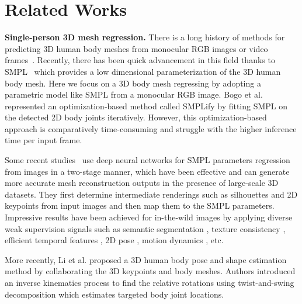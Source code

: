 \documentclass[runningheads]{llncs}
\begin{document}
\section{Related Works}

\noindent \textbf{Single-person 3D mesh regression.} There is a long history of methods for predicting 3D human body meshes from monocular RGB images or video frames~\cite{guan2009estimating}. Recently, there has been quick advancement in this field thanks to SMPL~\cite{smpl} which provides a low dimensional parameterization of the 3D human body mesh. Here we focus on a 3D body mesh regressing by adopting a parametric model like SMPL from a monocular RGB image. Bogo et al.~\cite{bogo2016keep} represented an optimization-based method called SMPLify by fitting SMPL on the detected 2D body joints iteratively. However, this optimization-based approach is comparatively time-consuming and struggle with the higher inference time per input frame.

Some recent studies~\cite{kolotouros2019convolutional,omran2018neural,pavlakos2018learning} use deep neural networks for SMPL parameters regression from images in a two-stage manner, which have been effective and can generate more accurate mesh reconstruction outputs in the presence of large-scale 3D datasets. They first determine intermediate renderings such as silhouettes and 2D keypoints from input images and then map them to the SMPL parameters. Impressive results have been achieved for in-the-wild images by applying diverse weak supervision signals such as semantic segmentation \cite{xu2019denserac}, texture consistency \cite{pavlakos2019texturepose}, efficient temporal features \cite{kocabas2020vibe,sun2019human,tung2017self}, 2D pose \cite{choi2020pose2mesh,kanazawa2018end,kundu2020appearance}, motion dynamics \cite{kanazawa2019learning}, etc.

More recently, Li et al. \cite{li2021hybrik} proposed a 3D human body pose and shape estimation method by collaborating the 3D keypoints and body meshes. Authors introduced an inverse kinematics process to find the relative rotations using twist-and-swing decomposition which estimates targeted body joint locations.
\end{document}
